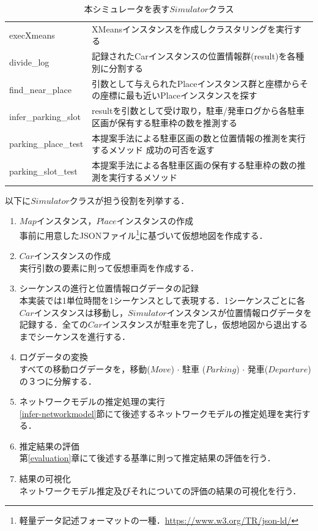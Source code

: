 \begin{table}[htbp]
{\begin{tabular}{ll}
			\multicolumn{1}{l|}{execXmeans}               & XMeansインスタンスを作成しクラスタリングを実行する                                                            \\
			\multicolumn{1}{l|}{divide\_log}              & 記録されたCarインスタンスの位置情報群(result)を各種別に分割する                                           \\
			\multicolumn{1}{l|}{find\_near\_place}        & 引数として与えられたPlaceインスタンス群と座標からその座標に最も近いPlaceインスタンスを探す  \\
			\multicolumn{1}{l|}{infer\_parking\_slot}     & resultを引数として受け取り，駐車/発車ログから各駐車区画が保有する駐車枠の数を推測する        \\
			\multicolumn{1}{l|}{parking\_place\_test}     & 本提案手法による駐車区画の数と位置情報の推測を実行するメソッド 成功の可否を返す              \\
			\multicolumn{1}{l|}{parking\_slot\_test}      & 本提案手法による各駐車区画の保有する駐車枠の数の推測を実行するメソッド                           \\ \hline
		\end{tabular}%
	}
	\caption{本シミュレータを表す$Simulator$クラス}
	\label{simulator-class}
\end{table}


以下に$Simulator$クラスが担う役割を列挙する．
\begin{enumerate}
	\item $Map$インスタンス，$Place$インスタンスの作成 \\
	      事前に用意したJSONファイル\footnote{軽量データ記述フォーマットの一種．\url{https://www.w3.org/TR/json-ld/}}に基づいて仮想地図を作成する．
	\item $Car$インスタンスの作成 \\
	      実行引数の要素に則って仮想車両を作成する．
	\item シーケンスの進行と位置情報ログデータの記録 \\
	      本実装では1単位時間を1シーケンスとして表現する．1シーケンスごとに各$Car$インスタンスは移動し，$Simulator$インスタンスが位置情報ログデータを記録する．全ての$Car$インスタンスが駐車を完了し，仮想地図から退出するまでシーケンスを進行する．
	\item ログデータの変換 \\
	      すべての移動ログデータを，移動($Move$) $\cdot$ 駐車 ($Parking$) $\cdot$ 発車($Departure$)の３つに分解する．
	\item ネットワークモデルの推定処理の実行 \\
	      \ref{infer-networkmodel}節にて後述するネットワークモデルの推定処理を実行する．
	\item 推定結果の評価 \\
	      第\ref{evaluation}章にて後述する基準に則って推定結果の評価を行う．
	\item 結果の可視化 \\
	      ネットワークモデル推定及びそれについての評価の結果の可視化を行う．
	      	      	      	      	        
\end{enumerate}


